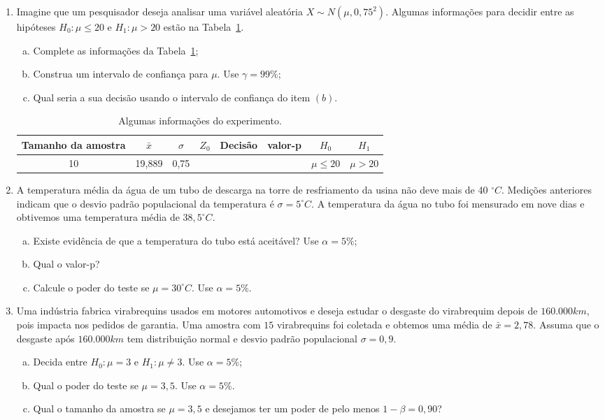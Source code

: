 \documentclass[12pt, a4paper]{article}
\begin{document}
\begin{enumerate}
	\item Imagine que um pesquisador deseja analisar uma variável aleatória $X \sim N(\mu, 0,75^2)$. Algumas informações para decidir entre as hipóteses $H_0: \mu \leq 20$ e $H_1: \mu > 20$ estão na Tabela~\ref{tab:exe3}.
	\begin{enumerate}[(a)]
		\item Complete as informações da Tabela~\ref{tab:exe3};
		\item Construa um intervalo de confiança para $\mu$. Use $\gamma = 99\%$;
		\item Qual seria a sua decisão usando o intervalo de confiança do item $(b)$.
	\end{enumerate}
	\begin{table}[htbp]
		\centering
		\begin{tabular}{c|c|c|c|c|c|c|c}
			\toprule[0.05cm]
			Tamanho da amostra & $\bar{x}$ & $\sigma$ & $Z_0$ & Decisão & valor-p & $H_0$ & $H_1$ \\ \midrule[0.025cm]
			10 & 19,889 & 0,75 & & & & $\mu \leq 20$ & $\mu > 20$ \\
			\bottomrule[0.05cm]
		\end{tabular}
		\caption{Algumas informações do experimento.}
		\label{tab:exe3}
	\end{table}

	\item A temperatura média da água de um
	tubo de descarga na torre de resfriamento da usina não deve mais de 40 $^\circ C$. Medições anteriores indicam que o desvio padrão populacional da temperatura é $\sigma = 5 ^\circ C$. A temperatura da água no tubo foi mensurado em nove dias e obtivemos uma temperatura média de $38,5 ^\circ C$.
	\begin{enumerate}[(a)]
		\item Existe evidência de que a temperatura do tubo está aceitável? Use $\alpha=5\%$;
		\item Qual o valor-p?
		\item Calcule o poder do teste se $\mu=30 ^\circ C$. Use $\alpha=5\%$.
	\end{enumerate}

	\item Uma indústria fabrica virabrequins usados em motores automotivos e deseja estudar o desgaste do virabrequim depois de $160.000 km$, pois impacta nos pedidos de garantia. Uma amostra com $15$ virabrequins foi coletada e obtemos uma média de $\bar{x} = 2,78$. Assuma que o desgaste após $160.000 km$ tem distribuição normal e desvio padrão populacional $\sigma = 0,9$. 
	\begin{enumerate}[(a)]
		\item Decida entre $H_0: \mu = 3$ e $H_1: \mu \neq 3$. Use $\alpha = 5\%$;
		\item Qual o poder do teste se $\mu=3,5$. Use $\alpha = 5\%$.
		\item Qual o tamanho da amostra se $\mu=3,5$ e desejamos ter um poder de pelo menos $1-\beta = 0,90$?
	\end{enumerate}
	

\end{enumerate}
\end{document}
